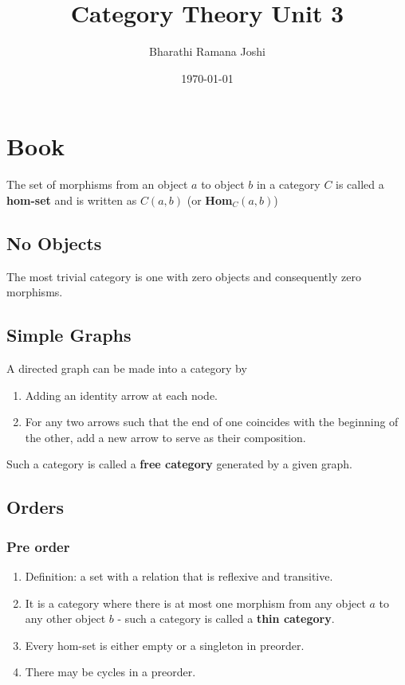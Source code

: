 \documentclass[titlepage, 12pt]{article}
\begin{document}
\title{Category Theory Unit 3}

\author{Bharathi Ramana Joshi}

\date{\today}

\maketitle

\newpage

\section{Book}

The set of morphisms from an object $a$ to object $b$ in a category $C$ is
called a \textbf{hom-set} and is written as $C(a, b)$ (or \textbf{Hom}$_C(a,
b)$)

\subsection{No Objects}

The most trivial category is one with zero objects and consequently zero
morphisms.

\subsection{Simple Graphs}

A directed graph can be made into a category by
\begin{enumerate}
	\item Adding an identity arrow at each node.
	\item For any two arrows such that the end of one coincides with the
		beginning of the other, add a new arrow to serve as their composition.
\end{enumerate}
Such a category is called a \textbf{free category} generated by a given graph.

\subsection{Orders}

\subsubsection{Pre order}
\begin{enumerate}
	\item Definition: a set with a relation that is reflexive and transitive.
	\item It is a category where there is at most one morphism from any object
		$a$ to any other object $b$ - such a category is called a \textbf{thin
		category}.
	\item Every hom-set is either empty or a singleton in preorder.
	\item There may be cycles in a preorder.
\end{enumerate}
\end{document}
